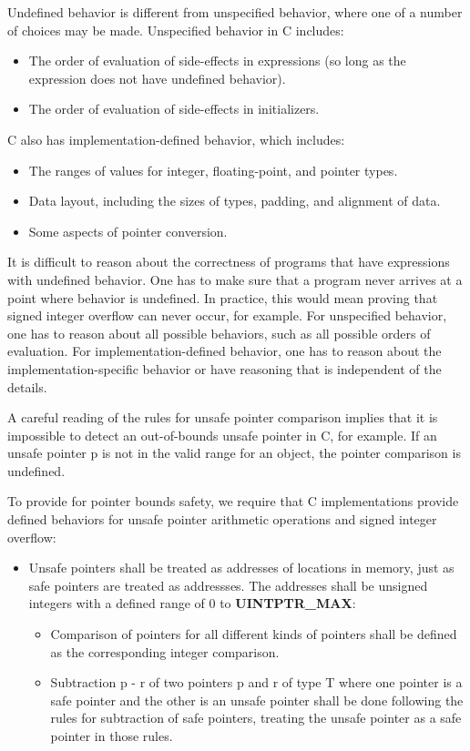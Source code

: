 \documentclass[]{article}
\begin{document}
Undefined behavior is different from unspecified behavior, where one of
a number of choices may be made. Unspecified behavior in C includes:

\begin{itemize}
\item
  The order of evaluation of side-effects in expressions (so long as the
  expression does not have undefined behavior).
\item
  The order of evaluation of side-effects in initializers.
\end{itemize}

C also has implementation-defined behavior, which includes:

\begin{itemize}
\item
  The ranges of values for integer, floating-point, and pointer types.
\item
  Data layout, including the sizes of types, padding, and alignment of
  data.
\item
  Some aspects of pointer conversion.
\end{itemize}

It is difficult to reason about the correctness of programs that have
expressions with undefined behavior. One has to make sure that a program
never arrives at a point where behavior is undefined. In practice, this
would mean proving that signed integer overflow can never occur, for
example. For unspecified behavior, one has to reason about all possible
behaviors, such as all possible orders of evaluation. For
implementation-defined behavior, one has to reason about the
implementation-specific behavior or have reasoning that is independent
of the details.

A careful reading of the rules for unsafe pointer comparison implies
that it is impossible to detect an out-of-bounds unsafe pointer in C,
for example. If an unsafe pointer p is not in the valid range for an
object, the pointer comparison is undefined.

To provide for pointer bounds safety, we require that C implementations
provide defined behaviors for unsafe pointer arithmetic operations and
signed integer overflow:

\begin{itemize}
\item
  Unsafe pointers shall be treated as addresses of locations in memory,
  just as safe pointers are treated as addressses. The addresses shall
  be unsigned integers with a defined range of 0 to
  \textbf{UINTPTR\_MAX}:

  \begin{itemize}
  \item
    Comparison of pointers for all different kinds of pointers shall be
    defined as the corresponding integer comparison.
  \item
    Subtraction p - r of two pointers p and r of type T where one
    pointer is a safe pointer and the other is an unsafe pointer shall
    be done following the rules for subtraction of safe pointers,
    treating the unsafe pointer as a safe pointer in those rules.
  \end{itemize}
\end{itemize}
\end{document}
